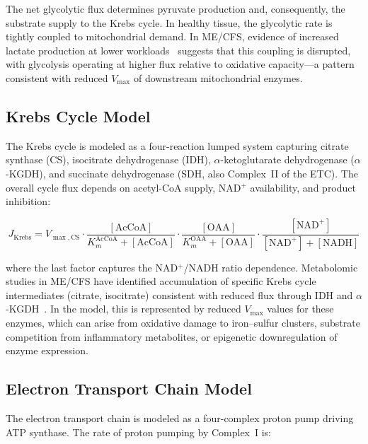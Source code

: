 The net glycolytic flux determines pyruvate production and, consequently, the substrate supply to the Krebs cycle. In healthy tissue, the glycolytic rate is tightly coupled to mitochondrial demand. In ME/CFS, evidence of increased lactate production at lower workloads~\cite{keller2024cpet} suggests that this coupling is disrupted, with glycolysis operating at higher flux relative to oxidative capacity---a pattern consistent with reduced $V_{\max}$ of downstream mitochondrial enzymes.

\subsection{Krebs Cycle Model}
\label{sec:krebs-cycle-model}

The Krebs cycle is modeled as a four-reaction lumped system capturing citrate synthase (CS), isocitrate dehydrogenase (IDH), $\alpha$-ketoglutarate dehydrogenase ($\alpha$-KGDH), and succinate dehydrogenase (SDH, also Complex~II of the ETC). The overall cycle flux depends on acetyl-CoA supply, NAD$^+$ availability, and product inhibition:

\begin{equation}
\label{eq:krebs-flux}
J_{\text{Krebs}} = V_{\max,\text{CS}} \cdot \frac{[\text{AcCoA}]}{K_m^{\text{AcCoA}} + [\text{AcCoA}]} \cdot \frac{[\text{OAA}]}{K_m^{\text{OAA}} + [\text{OAA}]} \cdot \frac{[\text{NAD}^+]}{[\text{NAD}^+] + [\text{NADH}]}
\end{equation}

where the last factor captures the NAD$^+$/NADH ratio dependence. Metabolomic studies in ME/CFS have identified accumulation of specific Krebs cycle intermediates (citrate, isocitrate) consistent with reduced flux through IDH and $\alpha$-KGDH~\cite{Germain2020metabolic,Naviaux2016metabolomics}. In the model, this is represented by reduced $V_{\max}$ values for these enzymes, which can arise from oxidative damage to iron--sulfur clusters, substrate competition from inflammatory metabolites, or epigenetic downregulation of enzyme expression.

\subsection{Electron Transport Chain Model}
\label{sec:etc-model}

The electron transport chain is modeled as a four-complex proton pump driving ATP synthase. The rate of proton pumping by Complex~I is:

